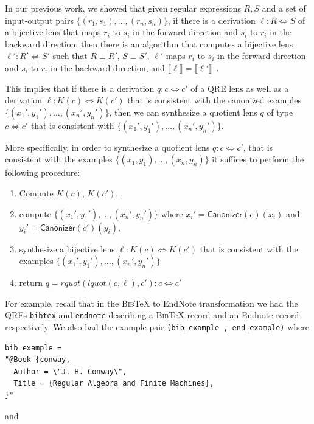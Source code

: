 \documentclass{svproc}
\newcommand{\cd}[1]{\lstinline[backgroundcolor=\color{white}]$#1$}
\newcommand{\kw}[1]{\ensuremath{\mathsf{#1}}}
\newcommand{\canonizer}{\ensuremath{\kw{Canonizer}}}
\newcommand{\bibtex}{\textsc{Bib}\TeX{}}
\begin{document}
In our previous work, we showed that given regular expressions $R, S$ and a set
of input-output pairs $\{(r_1, s_1), \ldots, (r_n, s_n)\}$, if there is a
derivation $\ell : R \Leftrightarrow S$ of a bijective lens that maps $r_i$ to
$s_i$ in the forward direction and $s_i$ to $r_i$ in the backward direction,
then there is an algorithm that computes a bijective lens $\ell' : R'
\Leftrightarrow S'$ such that $R \equiv R'$, $S \equiv S'$, $\ell'$ maps $r_i$
to $s_i$ in the forward direction and $s_i$ to $r_i$ in the backward direction,
and $\llbracket \ell \rrbracket = \llbracket \ell' \rrbracket$~\cite{popl18}.

This implies that if there is a derivation $q : c \Leftrightarrow
c'$ of a QRE lens as well as a derivation $\ell : K(c) \Leftrightarrow K(c')$
that is consistent with the canonized examples $\{({x_1}', {y_1}'),
\ldots, ({x_n}', {y_n}')\}$, then we can synthesize a quotient lens $q$ of
type $c \Leftrightarrow c'$ that is consistent with $\{({x_1}', {y_1}'),
\ldots, ({x_n}', {y_n}')\}$.

More specifically, in order to synthesize a quotient lens $q: c \Leftrightarrow
c'$, that is consistent with the examples $\{(x_1, y_1), \ldots, (x_n, y_n)\}$
 it suffices to perform the following procedure:
\begin{enumerate}
  \item
  Compute $K(c)$, $K(c')$,
  \item
  compute $\{({x_1}', {y_1}'), \ldots, ({x_n}', {y_n}')\}$ where ${x_i}' =
  \canonizer(c)(x_i)$ and ${y_i}' = \canonizer(c')(y_i)$,
  \item
    synthesize a bijective lens $\ell : K(c) \Leftrightarrow K(c')$ that is
    consistent with the examples $\{({x_1}', {y_1}'), \ldots, ({x_n}',
    {y_n}')\}$
  \item 
  return $q = \mathit{rquot}(\mathit{lquot}(c, \ell), c') : c \Leftrightarrow
  c'$
\end{enumerate}
For example, recall that in the \bibtex{} to EndNote transformation we had the
QREs \cd{bibtex} and \cd{endnote} describing a \bibtex{} record and an Endnote
record respectively. We also had the example pair \cd{(bib_example ,
end_example)} where

\begin{lstlisting}
bib_example = 
"@Book {conway,
  Author = \"J. H. Conway\",
  Title = {Regular Algebra and Finite Machines},
}"
\end{lstlisting}

\noindent and
\end{document}
